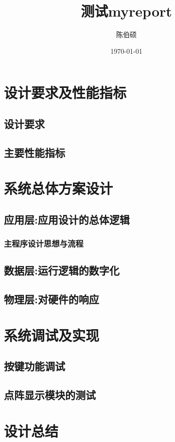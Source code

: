 \documentclass[pdfCover]{myreport} %
\title{测试myreport}
\author{陈伯硕}
\date{\today}
\begin{document}
\maketitle

\tableofcontents
\newpage

\section{设计要求及性能指标}
  \subsection{设计要求}
  \subsection{主要性能指标}

\section{系统总体方案设计}
  \subsection{应用层:应用设计的总体逻辑}
    \subsubsection{主程序设计思想与流程}
      
  \subsection{数据层:运行逻辑的数字化}

  \subsection{物理层:对硬件的响应}

\section{系统调试及实现}
  \subsection{按键功能调试}
    
  \subsection{点阵显示模块的测试}
    


\section{设计总结}
  



\nocite{*}
\end{document}
